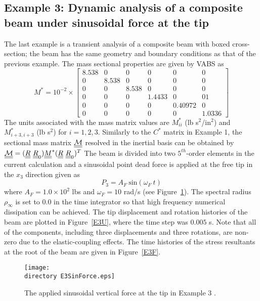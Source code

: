 \subsection{Example 3: Dynamic analysis of a composite beam under sinusoidal force at the tip}

The last example is a transient analysis of a composite beam with boxed
cross-section; the beam has the same
geometry and boundary conditions as that of the previous example. The mass
sectional properties are given by VABS \cite{Yu-etal:2002,Wang-Yu:2012} as
\begin{equation}
    \label{E3Mass}
    M^* = 10^{-2} \times \begin{bmatrix}
	8.538 & 0     & 0     & 0      & 0      & 0      \\
	0       & 8.538 & 0     & 0      & 0      & 0      \\
	0       & 0     & 8.538 & 0      & 0      & 0      \\
	0       & 0     & 0     & 1.4433  & 0  & 01 \\
	0       & 0     & 0     & 0  & 0.40972  &0 \\
	0       & 0     & 0     & 0 & 0 & 1.0336
\end{bmatrix}    
\end{equation}
The units associated with the mass matrix values are $M_{ii}^*$ (lb s$^2$/in$^2$) and $M_{i+3,i+3}^*$ (lb s$^2$) for $i = 1,2,3$. Similarly to the $C^*$ matrix in Example 1, the sectional mass matrix $\underline{\underline{\mathcal{M}}}$ resolved in the inertial basis can be obtained by $\underline{\underline{\mathcal{M}}} = (\underline{\underline{R}}~\underline{\underline{R}}_0) \underline{\underline{M}}^*(\underline{\underline{R}}~\underline{\underline{R}}_0)^T$  The beam is divided into two $5^{th}$-order elements in the current calculation and a sinusoidal point dead force is applied at the free tip in the $x_3$ direction given as
\begin{equation}
    \label{E3AppliedForce}
    P_3 = A_F~\text{sin}(\omega_F~t)
\end{equation}
where $A_F = 1.0 \times 10^2$ lbs and $\omega_F = 10$ rad/s (see
Figure~\ref{E3SinForce}). 
The spectral radius $\rho_\infty$ is set to $0.0$ in the time integrator so that high frequency numerical dissipation can be achieved. The tip displacement and rotation histories of the beam are plotted in
Figure~\ref{E3U}, where the time step was $0.005$ s. Note that all of the components, including three displacements and three rotations, are non-zero due to the elastic-coupling effects. The time histories of the stress resultants at the root of the beam are given in Figure~\ref{E3F}.
\begin{figure}
    \centering
    \texttt{[image: \\directory E3SinForce.eps]}
    \caption{The applied sinusoidal vertical force at the tip in Example 3 .}
    \label{E3SinForce}
\end{figure}

